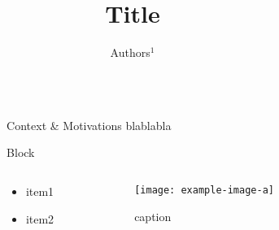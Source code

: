 \documentclass[final,hyperref={pdfpagelabels=false}]{beamer}
\title{\huge Title} %
\author{\normalsize Authors$^1$} %
\institute{\small$^1$ Northern Robotics Laboratory, Universit\'e Laval} %
\begin{document}

\begin{frame}[t] %

  \begin{columns}[t] %

    \begin{column}{.02\textwidth}\end{column} %

    \begin{column}{.465\textwidth} %


      \begin{block}{Context \& Motivations}
        blablabla
      \end{block}

      \begin{block}{Block}
        \begin{columns} %
          \begin{column}{.58\textwidth} %
            \begin{itemize}
              \item item1
              \item item2
            \end{itemize}
          \end{column}
          \begin{column}{.42\textwidth} %
            \centering
            \begin{figure}
              \texttt{[image: example-image-a]}
              \caption{caption}
            \end{figure}
          \end{column}
        \end{columns} %
      \end{block}



\end{column}
\end{columns}
\end{frame}
\end{document}
